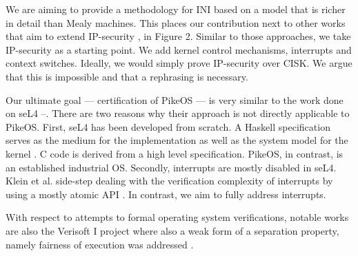 \documentclass[11pt,a4paper]{article}
\begin{document}
We are aiming to provide a methodology for INI based on a model that is richer 
in detail than Mealy machines. This places our contribution next to other works 
that aim to extend IP-security \cite{SKIPaper25}, \cite{SKIPaper31} in Figure 2. Similar to those 
approaches, we take IP-security as a starting point. We add kernel control 
mechanisms, interrupts and context switches. Ideally, we would simply prove 
IP-security over CISK. We argue that this is impossible and that a rephrasing 
is necessary.


Our ultimate goal --- certification of PikeOS --- is very similar to the work done 
on seL4 \cite{Murray_MBGK_12}--\cite{SKIPaper30}. There are two reasons why their 
approach is not directly applicable to PikeOS. First, seL4 has been developed 
from scratch. A Haskell specification serves as the medium for the implementation 
as well as the system model for the kernel \cite{Elphinstone:2007:TPV:1361397.1361417}. 
C code is derived from a high level specification. 
PikeOS, in contrast, is an established industrial OS. Secondly, interrupts are 
mostly disabled in seL4. Klein et al. side-step dealing with the verification 
complexity of interrupts by using a mostly atomic API \cite{Klein:2009:SFV:1629575.1629596}. 
In contrast, we  aim to fully address interrupts.

With respect to attempts to formal operating system verifications,
notable works are also the Verisoft I project \cite{DBLP:journals/jar/AlkassarHLSST09}
where also a weak form of a separation property, namely fairness of execution
was addressed \cite{DBLP:journals/jar/DaumDW09}.
\end{document}
